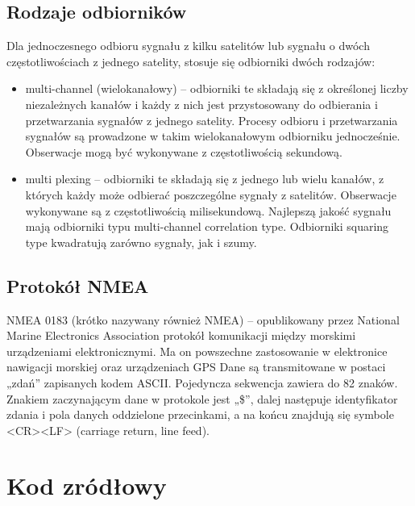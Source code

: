 \documentclass[12pt]{article}
\begin{document}
\subsection{Rodzaje odbiorników}
Dla jednoczesnego odbioru sygnału z kilku satelitów lub sygnału o dwóch częstotliwościach z jednego satelity, stosuje się odbiorniki dwóch rodzajów:
\begin{itemize}
\item multi-channel (wielokanałowy) – odbiorniki te składają się z określonej liczby niezależnych kanałów i każdy z nich jest przystosowany do odbierania i przetwarzania sygnałów z jednego satelity. Procesy odbioru i przetwarzania sygnałów są prowadzone w takim wielokanałowym odbiorniku jednocześnie. Obserwacje mogą być wykonywane z częstotliwością sekundową.
\item multi plexing – odbiorniki te składają się z jednego lub wielu kanałów, z których każdy może odbierać poszczególne sygnały z satelitów. Obserwacje wykonywane są z częstotliwością milisekundową. Najlepszą jakość sygnału mają odbiorniki typu multi-channel correlation type. Odbiorniki squaring type kwadratują zarówno sygnały, jak i szumy.
\end{itemize}
\subsection{Protokół NMEA}
NMEA 0183 (krótko nazywany również NMEA) – opublikowany przez National Marine Electronics Association protokół komunikacji między morskimi urządzeniami elektronicznymi. Ma on powszechne zastosowanie w elektronice nawigacji morskiej oraz urządzeniach GPS
Dane są transmitowane w postaci „zdań” zapisanych kodem ASCII. Pojedyncza sekwencja zawiera do 82 znaków. Znakiem zaczynającym dane w protokole jest „\$”, dalej następuje identyfikator zdania i pola danych oddzielone przecinkami, a na końcu znajdują się symbole <CR><LF> (carriage return, line feed).
\section{Kod zródłowy}
\end{document}
